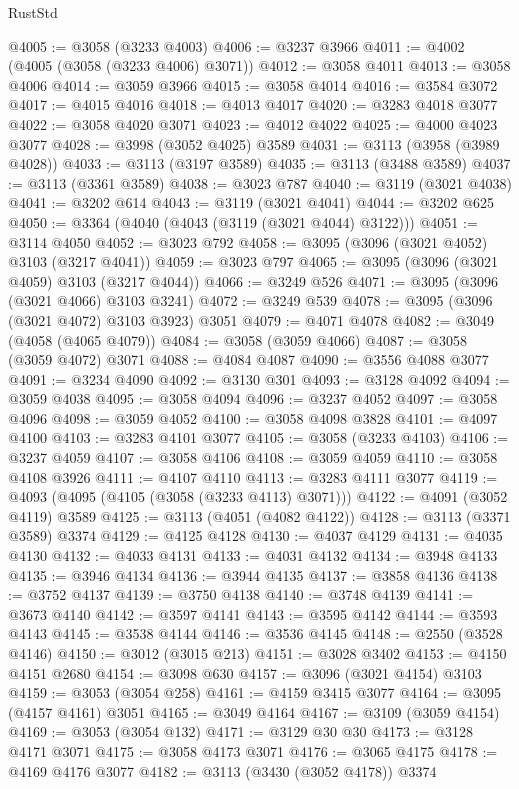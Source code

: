 \begin{lexlean}{RustStd}
\begin{coremodule}
@4005 := @3058 (@3233 @4003)
@4006 := @3237 @3966
@4011 := @4002 (@4005 (@3058 (@3233 @4006) @3071))
@4012 := @3058 @4011
@4013 := @3058 @4006
@4014 := @3059 @3966
@4015 := @3058 @4014
@4016 := @3584 @3072
@4017 := @4015 @4016
@4018 := @4013 @4017
@4020 := @3283 @4018 @3077
@4022 := @3058 @4020 @3071
@4023 := @4012 @4022
@4025 := @4000 @4023 @3077
@4028 := @3998 (@3052 @4025) @3589
@4031 := @3113 (@3958 (@3989 @4028))
@4033 := @3113 (@3197 @3589)
@4035 := @3113 (@3488 @3589)
@4037 := @3113 (@3361 @3589)
@4038 := @3023 @787
@4040 := @3119 (@3021 @4038)
@4041 := @3202 @614
@4043 := @3119 (@3021 @4041)
@4044 := @3202 @625
@4050 := @3364 (@4040 (@4043 (@3119 (@3021 @4044) @3122)))
@4051 := @3114 @4050
@4052 := @3023 @792
@4058 := @3095 (@3096 (@3021 @4052) @3103 (@3217 @4041))
@4059 := @3023 @797
@4065 := @3095 (@3096 (@3021 @4059) @3103 (@3217 @4044))
@4066 := @3249 @526
@4071 := @3095 (@3096 (@3021 @4066) @3103 @3241)
@4072 := @3249 @539
@4078 := @3095 (@3096 (@3021 @4072) @3103 @3923) @3051
@4079 := @4071 @4078
@4082 := @3049 (@4058 (@4065 @4079))
@4084 := @3058 (@3059 @4066)
@4087 := @3058 (@3059 @4072) @3071
@4088 := @4084 @4087
@4090 := @3556 @4088 @3077
@4091 := @3234 @4090
@4092 := @3130 @301
@4093 := @3128 @4092
@4094 := @3059 @4038
@4095 := @3058 @4094
@4096 := @3237 @4052
@4097 := @3058 @4096
@4098 := @3059 @4052
@4100 := @3058 @4098 @3828
@4101 := @4097 @4100
@4103 := @3283 @4101 @3077
@4105 := @3058 (@3233 @4103)
@4106 := @3237 @4059
@4107 := @3058 @4106
@4108 := @3059 @4059
@4110 := @3058 @4108 @3926
@4111 := @4107 @4110
@4113 := @3283 @4111 @3077
@4119 := @4093 (@4095 (@4105 (@3058 (@3233 @4113) @3071)))
@4122 := @4091 (@3052 @4119) @3589
@4125 := @3113 (@4051 (@4082 @4122))
@4128 := @3113 (@3371 @3589) @3374
@4129 := @4125 @4128
@4130 := @4037 @4129
@4131 := @4035 @4130
@4132 := @4033 @4131
@4133 := @4031 @4132
@4134 := @3948 @4133
@4135 := @3946 @4134
@4136 := @3944 @4135
@4137 := @3858 @4136
@4138 := @3752 @4137
@4139 := @3750 @4138
@4140 := @3748 @4139
@4141 := @3673 @4140
@4142 := @3597 @4141
@4143 := @3595 @4142
@4144 := @3593 @4143
@4145 := @3538 @4144
@4146 := @3536 @4145
@4148 := @2550 (@3528 @4146)
@4150 := @3012 (@3015 @213)
@4151 := @3028 @3402
@4153 := @4150 @4151 @2680
@4154 := @3098 @630
@4157 := @3096 (@3021 @4154) @3103
@4159 := @3053 (@3054 @258)
@4161 := @4159 @3415 @3077
@4164 := @3095 (@4157 @4161) @3051
@4165 := @3049 @4164
@4167 := @3109 (@3059 @4154)
@4169 := @3053 (@3054 @132)
@4171 := @3129 @30 @30
@4173 := @3128 @4171 @3071
@4175 := @3058 @4173 @3071
@4176 := @3065 @4175
@4178 := @4169 @4176 @3077
@4182 := @3113 (@3430 (@3052 @4178)) @3374

\end{coremodule}
\end{lexlean}
